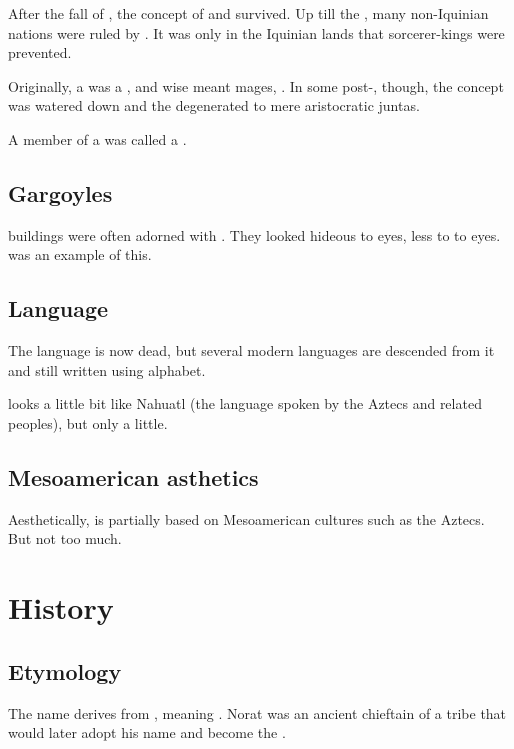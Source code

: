After the fall of \Ortaica, the concept of \baccons and \bacconates survived. 
Up till the \thirdbanewar, many non-Iquinian nations were ruled by \rethyaxes.
It was only in the Iquinian lands that sorcerer-kings were prevented. 

Originally, a \baccon was a , and wise meant mages, \rethyaxes.
In some post-\Ortaican \bacconates, though, the concept was watered down and the \baccons degenerated to mere aristocratic juntas. 

A member of a \baccon{} was called a .





\subsection{Gargoyles}
\Ortaican buildings were often adorned with .
They looked hideous to \human eyes, less to to \scathaese eyes.
\Forclin was an example of this.





\subsection{Language}
The \Ortaican{} language is now dead, but several modern languages are descended from it and still written using \Ortaican{} alphabet. 

\Ortaican looks a little bit like Nahuatl (the language spoken by the Aztecs and related peoples), but only a little.





\subsection{Mesoamerican asthetics}
Aesthetically, \Ortaica is partially based on Mesoamerican cultures such as the Aztecs.
But not too much.









\section{History}
\subsection{Etymology}
The name \quo{\Ortaican} derives from , meaning . 
Norat was an ancient chieftain of a \Mastheno{} tribe that would later adopt his name and become the \Ortaicans. 





